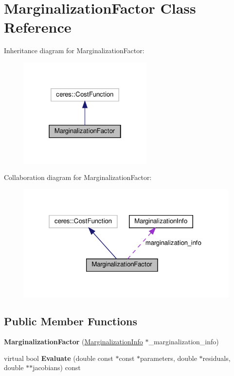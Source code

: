 \hypertarget{classMarginalizationFactor}{}\section{Marginalization\+Factor Class Reference}
\label{classMarginalizationFactor}


Inheritance diagram for Marginalization\+Factor\+:\nopagebreak
\begin{figure}[H]
\begin{center}
\leavevmode
\includegraphics[width=190pt]{classMarginalizationFactor__inherit__graph}
\end{center}
\end{figure}


Collaboration diagram for Marginalization\+Factor\+:\nopagebreak
\begin{figure}[H]
\begin{center}
\leavevmode
\includegraphics[width=316pt]{classMarginalizationFactor__coll__graph}
\end{center}
\end{figure}
\subsection*{Public Member Functions}
\begin{DoxyCompactItemize}
\item 
\mbox{\label{classMarginalizationFactor_a8807adb1502db07cd28834e1a0791a77}} 
{\bfseries Marginalization\+Factor} (\hyperlink{classMarginalizationInfo}{Marginalization\+Info} $\ast$\+\_\+marginalization\+\_\+info)
\item 
\mbox{\label{classMarginalizationFactor_af9a1dd71432066824d88c67c3b4d4779}} 
virtual bool {\bfseries Evaluate} (double const $\ast$const $\ast$parameters, double $\ast$residuals, double $\ast$$\ast$jacobians) const
\end{DoxyCompactItemize}
